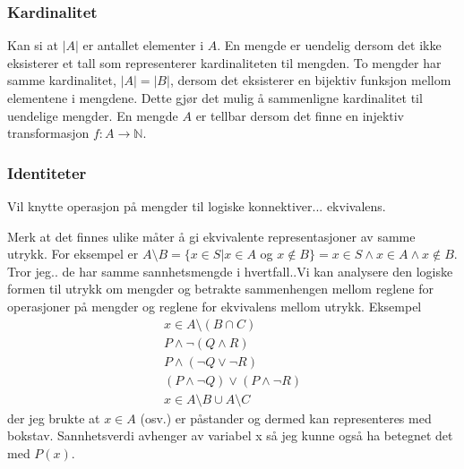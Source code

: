 \subsubsection{Kardinalitet}
Kan si at $|A|$ er antallet elementer i $A$. En mengde er uendelig dersom det ikke eksisterer et tall som representerer kardinaliteten til mengden. To mengder har samme kardinalitet, $|A|=|B|$, dersom det eksisterer en bijektiv funksjon mellom elementene i mengdene. Dette gjør det mulig å sammenligne kardinalitet til uendelige mengder. En mengde $A$ er tellbar dersom det finne en injektiv transformasjon $f:A\to\mathbb{N}$.
\subsubsection{Identiteter}
Vil knytte operasjon på mengder til logiske konnektiver... ekvivalens.

Merk at det finnes ulike måter å gi ekvivalente representasjoner av samme utrykk. For eksempel er $ A \setminus B = \{x\in S|x \in A$ og $x \notin B \} = x \in S \land x \in A \land x \notin B$. Tror jeg.. de har samme sannhetsmengde i hvertfall..Vi kan analysere den logiske formen til utrykk om mengder og betrakte sammenhengen mellom reglene for operasjoner på mengder og reglene for ekvivalens mellom utrykk. Eksempel
\begin{align}
x \in A \setminus (B \cap C) \\
P \land \neg (Q \land R) \\
P \land (\neg Q \lor \neg R ) \\
(P \land \neg Q) \lor (P \land \neg R) \\
x \in A \setminus B \cup A \setminus C
\end{align}
der jeg brukte at $x\in A$ (osv.) er påstander og dermed kan representeres med bokstav. Sannhetsverdi avhenger av variabel x så jeg kunne også ha betegnet det med $P(x)$.

